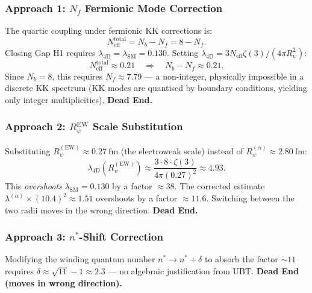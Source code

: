 \documentclass[12pt]{article}
\theoremstyle{definition}
\theoremstyle{remark}
\begin{document}
\subsubsection{Approach 1: $N_f$ Fermionic Mode Correction}

The quartic coupling under fermionic KK corrections is:
\begin{equation}
  N_{\mathrm{eff}}^{\mathrm{total}} = N_b - N_f = 8 - N_f.
\end{equation}
Closing Gap H1 requires $\lambda_{\mathrm{4D}} = \lambda_{\mathrm{SM}} = 0.130$.
Setting $\lambda_{\mathrm{4D}} = 3N_{\mathrm{eff}}\zeta(3)/(4\pi R_\psi^2)$:
\begin{equation}
  N_{\mathrm{eff}}^{\mathrm{total}} \approx 0.21
  \quad\Longrightarrow\quad
  N_b - N_f \approx 0.21.
\end{equation}
Since $N_b = 8$, this requires $N_f \approx 7.79$ — a non-integer, physically
impossible in a discrete KK spectrum (KK modes are quantised by boundary
conditions, yielding only integer multiplicities).  \textbf{Dead End.}

\subsubsection{Approach 2: $R_\psi^{\mathrm{EW}}$ Scale Substitution}

Substituting $R_\psi^{(\mathrm{EW})} \approx 0.27\ \text{fm}$ (the electroweak
scale) instead of $R_\psi^{(\alpha)} \approx 2.80\ \text{fm}$:
\begin{equation}
  \lambda_{\mathrm{4D}}(R_\psi^{(\mathrm{EW})})
  \approx \frac{3 \cdot 8 \cdot \zeta(3)}{4\pi (0.27)^2}
  \approx 4.93.
\end{equation}
This \emph{overshoots} $\lambda_{\mathrm{SM}} = 0.130$ by a factor $\approx 38$.
The corrected estimate $\lambda^{(\alpha)} \times (10.4)^2 \approx 1.51$ overshoots
by a factor $\approx 11.6$.  Switching between the two radii moves in the wrong
direction.  \textbf{Dead End.}

\subsubsection{Approach 3: $n^*$-Shift Correction}

Modifying the winding quantum number $n^* \to n^* + \delta$ to absorb the factor
$\sim 11$ requires $\delta \approx \sqrt{11} - 1 \approx 2.3$ — no algebraic
justification from UBT.  \textbf{Dead End (moves in wrong direction).}
\end{document}
